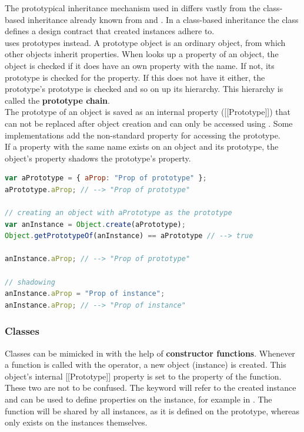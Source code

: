 The prototypical inheritance mechanism used in  differs vastly from the class-based inheritance already known from  and . In a class-based inheritance the class defines a design contract that created instances adhere to.\\
 uses prototypes instead. A prototype object is an ordinary  object, from which other objects inherit properties. When  looks up a property of an object, the object is checked if it does have an own property with the name. If not, its prototype is checked for the property. If this does not have it either, the prototype's prototype is checked and so on up its hierarchy. This hierarchy is called the \textbf{prototype chain}.\\
The prototype of an object is saved as an internal property ([[Prototype]]) that \linebreak can not be replaced after object creation and can only be accessed using \linebreak{}. Some implementations add the non-standard \linebreak{} property for accessing the prototype.\\
If a property with the same name exists on an object and its prototype, the object's property shadows the prototype's property.

\SingleSpacing
\begin{lstlisting}[language=JavaScript, caption=Prototypes]
var aPrototype = { aProp: "Prop of prototype" };
aPrototype.aProp; // --> "Prop of prototype"

// creating an object with aPrototype as the prototype
var anInstance = Object.create(aPrototype);
Object.getPrototypeOf(anInstance) == aPrototype // --> true

anInstance.aProp; // --> "Prop of prototype"

// shadowing
anInstance.aProp = "Prop of instance";
anInstance.aProp; // --> "Prop of instance"
\end{lstlisting}
\OnehalfSpacing

\subsubsection{Classes}
\label{sec:JSClasses}

Classes can be mimicked in  with the help of \textbf{constructor functions}. Whenever a function is called with the  operator, a new  object (instance) is created. This object's internal [[Prototype]] property is set to the  property of the function. These two are not to be confused. The  keyword will refer to the created instance and can be used to define properties on the instance, for example  in . The  function will be shared by all instances, as it is defined on the prototype, whereas  only exists on the instances themselves.

